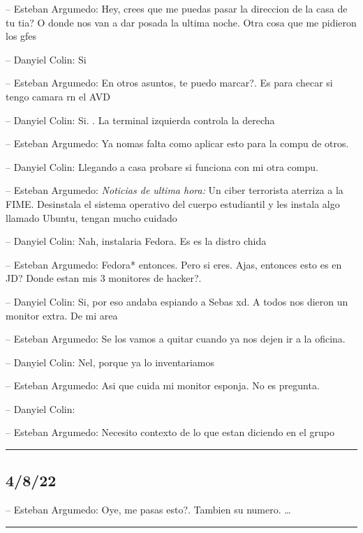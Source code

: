 -- Esteban Argumedo: Hey, crees que me puedas pasar la direccion de la
casa de tu tia? O donde nos van a dar posada la ultima noche. Otra cosa
que me pidieron los gfes

-- Danyiel Colin: Si

-- Esteban Argumedo: En otros asuntos, te puedo marcar?. Es para checar
si tengo camara rn el AVD

-- Danyiel Colin: Si. . La terminal izquierda controla la derecha

-- Esteban Argumedo: Ya nomas falta como aplicar esto para la compu de
otros.

-- Danyiel Colin: Llegando a casa probare si funciona con mi otra compu.

-- Esteban Argumedo: \emph{Noticias de ultima hora:} Un ciber terrorista
aterriza a la FIME. Desinstala el sistema operativo del cuerpo
estudiantil y les instala algo llamado Ubuntu, tengan mucho cuidado

-- Danyiel Colin: Nah, instalaria Fedora. Es es la distro chida

-- Esteban Argumedo: Fedora* entonces. Pero si eres. Ajas, entonces esto
es en JD? Donde estan mis 3 monitores de hacker?.

-- Danyiel Colin: Si, por eso andaba espiando a Sebas xd. A todos nos
dieron un monitor extra. De mi area

-- Esteban Argumedo: Se los vamos a quitar cuando ya nos dejen ir a la
oficina.

-- Danyiel Colin: Nel, porque ya lo inventariamos

-- Esteban Argumedo: Asi que cuida mi monitor esponja. No es pregunta.

-- Danyiel Colin:

-- Esteban Argumedo: Necesito contexto de lo que estan diciendo en el
grupo

\begin{center}\rule{0.5\linewidth}{0.5pt}\end{center}

\hypertarget{section-52}{%
\subsection{4/8/22}\label{section-52}}

-- Esteban Argumedo: Oye, me pasas esto?. Tambien su numero. \ldots{}

\begin{center}\rule{0.5\linewidth}{0.5pt}\end{center}

